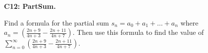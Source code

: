 \documentclass[12pt]{article}
\newcommand{\<}{\left\langle}
\renewcommand{\>}{\right\rangle}
\newcommand{\exerciseHeader}[4]{


  \vspace{0.5em}
  \textbf{#2}
  \vspace{0.5em}

}
\begin{document}
\begin{multicols}{2}
%

%

%

\columnbreak

\exerciseHeader{2017 July 14}{C12: PartSum.}{
Find the value of a convergent series by expressing it as a limit of
partial sums.
}{4/4}

Find a formula for the partial sum \(s_n=a_0+a_1+\dots+a_n\) where
\(a_n=(\frac{2n+9}{4n+3}-\frac{2n+11}{4n+7})\). Then use this formula to find
the value of \(\sum_{n=0}^\infty
(\frac{2n+9}{4n+3}-\frac{2n+11}{4n+7})\).



%
%

%
%


\end{multicols}
\end{document}
